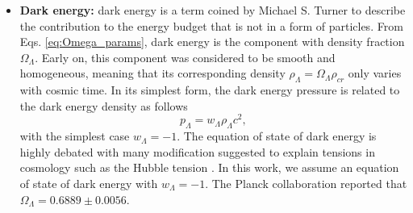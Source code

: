 \begin{itemize}
    \begin{equation}
        \rho_c = \rho_{c, 0} a^{-3}.
    \end{equation}
    The present day value of the dark matter density fraction is measured to be $\Omega_{\mathrm{m}} h^2 = 0.1431 \pm 0.0025$ by the Planck collaboration \citep{aghanim2020planck}. Dark matter is the main driver of matter clustering in the universe since dark matter can form virialized region of space called dark matter halos which accretes baryons and leads to galaxy formation as a consequence \citep{Wechsler_Tinker_2018}. 
    \item \textbf{Dark energy:} dark energy is a term coined by Michael S. Turner \citep{Turner_2001} to describe the contribution to the energy budget that is not in a form of particles. From Eqs. \ref{eq:Omega_params}, dark energy is the component with density fraction $\Omega_\Lambda$. Early on, this component was considered to be smooth and homogeneous, meaning that its corresponding density $\rho_\Lambda = \Omega_\Lambda \rho_{cr}$ only varies with cosmic time. In its simplest form, the dark energy pressure is related to the dark energy density as follows
    \begin{equation}
        p_\Lambda = w_\Lambda \rho_\Lambda c^2,
    \end{equation}
    with the simplest case $w_\Lambda = -1$. The equation of state of dark energy is highly debated with many modification suggested to explain tensions in cosmology such as the Hubble tension \citep{verde2024tale}. In this work, we assume an equation of state of dark energy with $w_\Lambda = -1$. The Planck collaboration \citep{aghanim2020planck} reported that $\Omega_\Lambda = 0.6889 \pm 0.0056$.
\end{itemize}

